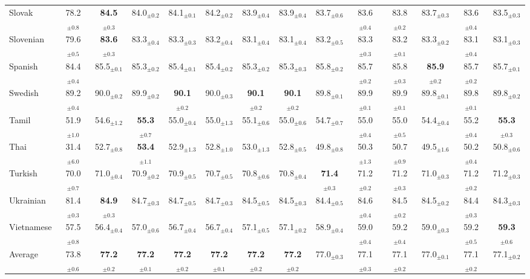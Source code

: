 \begin{table*}[ht]
{\begin{tabular}{lccccccccccccc}
Slovak & 78.2$_{\pm 0.8}$ & \textbf{84.5}$_{\pm 0.3}$ & 84.0$_{\pm 0.2}$ & 84.1$_{\pm 0.1}$ & 84.2$_{\pm 0.2}$ & 83.9$_{\pm 0.4}$ & 83.9$_{\pm 0.4}$ & 83.7$_{\pm 0.6}$ & 83.6$_{\pm 0.4}$ & 83.8$_{\pm 0.2}$ & 83.7$_{\pm 0.3}$ & 83.6$_{\pm 0.4}$ & 83.5$_{\pm 0.3}$ \\
Slovenian & 79.6$_{\pm 0.5}$ & \textbf{83.6}$_{\pm 0.3}$ & 83.3$_{\pm 0.4}$ & 83.3$_{\pm 0.3}$ & 83.2$_{\pm 0.4}$ & 83.1$_{\pm 0.4}$ & 83.1$_{\pm 0.4}$ & 83.2$_{\pm 0.5}$ & 83.3$_{\pm 0.3}$ & 83.2$_{\pm 0.1}$ & 83.3$_{\pm 0.2}$ & 83.1$_{\pm 0.4}$ & 83.1$_{\pm 0.3}$ \\
Spanish & 84.4$_{\pm 0.4}$ & 85.5$_{\pm 0.1}$ & 85.3$_{\pm 0.2}$ & 85.4$_{\pm 0.1}$ & 85.4$_{\pm 0.2}$ & 85.3$_{\pm 0.2}$ & 85.3$_{\pm 0.3}$ & 85.8$_{\pm 0.2}$ & 85.7$_{\pm 0.2}$ & 85.8$_{\pm 0.3}$ & \textbf{85.9}$_{\pm 0.2}$ & 85.7$_{\pm 0.2}$ & 85.7$_{\pm 0.1}$ \\
Swedish & 89.2$_{\pm 0.4}$ & 90.0$_{\pm 0.2}$ & 89.9$_{\pm 0.2}$ & \textbf{90.1}$_{\pm 0.2}$ & 90.0$_{\pm 0.3}$ & \textbf{90.1}$_{\pm 0.2}$ & \textbf{90.1}$_{\pm 0.2}$ & 89.8$_{\pm 0.1}$ & 89.9$_{\pm 0.1}$ & 89.9$_{\pm 0.1}$ & 89.8$_{\pm 0.1}$ & 89.8$_{\pm 0.1}$ & 89.8$_{\pm 0.2}$ \\
Tamil & 51.9$_{\pm 1.0}$ & 54.6$_{\pm 1.2}$ & \textbf{55.3}$_{\pm 0.7}$ & 55.0$_{\pm 0.4}$ & 55.0$_{\pm 1.3}$ & 55.1$_{\pm 0.6}$ & 55.0$_{\pm 0.6}$ & 54.7$_{\pm 0.7}$ & 55.0$_{\pm 0.4}$ & 55.0$_{\pm 0.5}$ & 54.4$_{\pm 0.4}$ & 55.2$_{\pm 0.4}$ & \textbf{55.3}$_{\pm 0.3}$ \\
Thai & 31.4$_{\pm 6.0}$ & 52.7$_{\pm 0.8}$ & \textbf{53.4}$_{\pm 1.1}$ & 52.9$_{\pm 1.3}$ & 52.8$_{\pm 1.0}$ & 53.0$_{\pm 1.3}$ & 52.8$_{\pm 0.5}$ & 49.8$_{\pm 0.8}$ & 50.3$_{\pm 1.3}$ & 50.7$_{\pm 0.9}$ & 49.5$_{\pm 1.6}$ & 50.2$_{\pm 0.4}$ & 50.8$_{\pm 0.6}$ \\
Turkish & 70.0$_{\pm 0.7}$ & 71.0$_{\pm 0.4}$ & 70.9$_{\pm 0.2}$ & 70.9$_{\pm 0.5}$ & 70.7$_{\pm 0.5}$ & 70.8$_{\pm 0.6}$ & 70.8$_{\pm 0.4}$ & \textbf{71.4}$_{\pm 0.3}$ & 71.2$_{\pm 0.2}$ & 71.2$_{\pm 0.3}$ & 71.0$_{\pm 0.3}$ & 71.2$_{\pm 0.2}$ & 71.2$_{\pm 0.3}$ \\
Ukrainian & 81.4$_{\pm 0.3}$ & \textbf{84.9}$_{\pm 0.3}$ & 84.7$_{\pm 0.3}$ & 84.7$_{\pm 0.5}$ & 84.7$_{\pm 0.3}$ & 84.5$_{\pm 0.5}$ & 84.5$_{\pm 0.3}$ & 84.4$_{\pm 0.5}$ & 84.6$_{\pm 0.4}$ & 84.5$_{\pm 0.2}$ & 84.5$_{\pm 0.2}$ & 84.4$_{\pm 0.3}$ & 84.3$_{\pm 0.3}$ \\
Vietnamese & 57.5$_{\pm 0.8}$ & 56.4$_{\pm 0.4}$ & 57.0$_{\pm 0.6}$ & 56.7$_{\pm 0.4}$ & 56.7$_{\pm 0.4}$ & 57.1$_{\pm 0.5}$ & 57.1$_{\pm 0.2}$ & 58.9$_{\pm 0.4}$ & 59.0$_{\pm 0.4}$ & 59.2$_{\pm 0.4}$ & 59.0$_{\pm 0.3}$ & 59.2$_{\pm 0.5}$ & \textbf{59.3}$_{\pm 0.6}$ \\
\hline
Average & 73.8$_{\pm 0.6}$ & \textbf{77.2}$_{\pm 0.2}$ & \textbf{77.2}$_{\pm 0.1}$ & \textbf{77.2}$_{\pm 0.2}$ & \textbf{77.2}$_{\pm 0.1}$ & \textbf{77.2}$_{\pm 0.2}$ & \textbf{77.2}$_{\pm 0.2}$ & 77.0$_{\pm 0.3}$ & 77.1$_{\pm 0.3}$ & 77.1$_{\pm 0.2}$ & 77.0$_{\pm 0.1}$ & 77.1$_{\pm 0.2}$ & 77.1$_{\pm 0.2}$ \\


\end{tabular}}
\end{table*}
